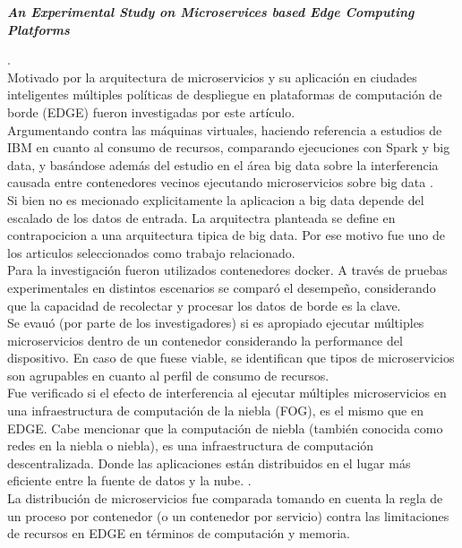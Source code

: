 \textbf{\emph{An Experimental Study on Microservices based Edge Computing Platforms}}

 \cite{qu_experimental_2020}.
\\
Motivado por la arquitectura de microservicios y su aplicación en ciudades inteligentes
múltiples políticas de despliegue en plataformas de computación de borde (EDGE) fueron investigadas por este artículo.\\

Argumentando contra las máquinas virtuales, haciendo referencia a estudios de IBM en cuanto al consumo de recursos, 
comparando ejecuciones con Spark \cite{ApacheSpark} y big data, y basándose además del estudio en el área big data sobre la interferencia causada entre contenedores vecinos ejecutando microservicios sobre big data \cite{BigDataWikipedia}.\\

Si bien no es mecionado explicitamente la aplicacion a big data depende del escalado de los datos de entrada. La arquitectra planteada se define en contrapocicion a una arquitectura tipica de big data. Por ese motivo fue uno de los articulos seleccionados como trabajo relacionado.\\

Para la investigación fueron utilizados contenedores docker. A través de pruebas experimentales en distintos escenarios se comparó el desempeño, considerando que la capacidad de recolectar y procesar los datos de borde es la clave.\\
Se evauó (por parte de los investigadores) si es apropiado ejecutar múltiples microservicios dentro de un contenedor considerando la performance del dispositivo.
En caso de que fuese viable, se identifican que tipos de microservicios son agrupables en cuanto al perfil de consumo de recursos.\\
Fue verificado si el efecto de interferencia al ejecutar múltiples microservicios en una infraestructura de computación de la niebla (FOG), es el mismo que en EDGE. Cabe mencionar que la computación de niebla (también conocida como redes en la niebla o niebla),
es una infraestructura de computación descentralizada. Donde las aplicaciones están distribuidos en el lugar más eficiente entre la fuente de datos y la nube.
\cite{webfog}.
\\
La distribución de microservicios fue comparada tomando en cuenta la regla de un proceso por contenedor (o un contenedor por servicio) 
\cite{cont_por_serv} 
contra las limitaciones de recursos en EDGE en términos de computación y memoria. 

